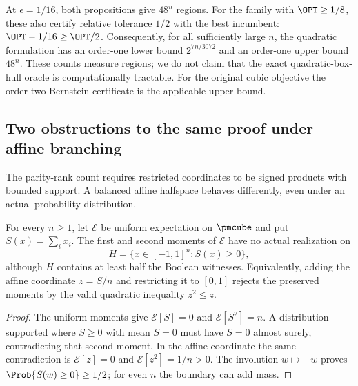 At $\epsilon=1/16$, both propositions give $48^n$ regions. For the
family with $\OPT\ge1/8$, these also certify relative tolerance $1/2$
with the best incumbent: $\OPT-1/16\ge\OPT/2$. Consequently, for all sufficiently large $n$, the quadratic formulation
has an order-one lower bound $2^{7n/3072}$ and an order-one upper bound
$48^n$. These counts measure regions; we do not claim that the exact
quadratic-box-hull oracle is computationally tractable. For the original
cubic objective the order-two Bernstein certificate is the applicable
upper bound.

\subsection{Two obstructions to the same proof under affine branching}
The parity-rank count requires restricted coordinates to be signed
products with bounded support. A balanced affine halfspace behaves
differently, even under an actual probability distribution.

\begin{proposition}
\label{prop:affine-quadratic-obstruction}
For every $n\ge1$, let $\mathcal E$ be uniform expectation on
$\pmcube$ and put $S(x)=\sum_i x_i$. The first and second moments of
$\mathcal E$ have no actual realization on
\[
 H=\{x\in[-1,1]^n:S(x)\ge0\},
\]
although $H$ contains at least half the Boolean witnesses. Equivalently,
adding the affine coordinate $z=S/n$ and restricting it to $[0,1]$
rejects the preserved moments by the valid quadratic inequality $z^2\le z$.
\end{proposition}
\begin{proof}
The uniform moments give $\mathcal E[S]=0$ and
$\mathcal E[S^2]=n$. A distribution supported where $S\ge0$ with
mean $S=0$ must have $S=0$ almost surely, contradicting that second
moment. In the affine coordinate the same contradiction is
$\mathcal E[z]=0$ and $\mathcal E[z^2]=1/n>0$.
The involution $w\mapsto-w$ proves $\Prob\{S(w)\ge0\}\ge1/2$;
for even $n$ the boundary can add mass.
\end{proof}

